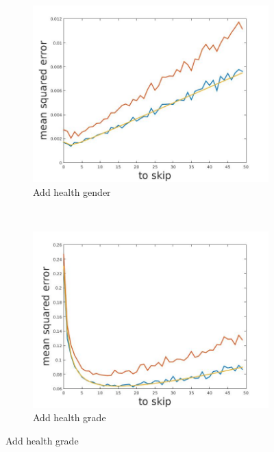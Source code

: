 \documentclass[12pt]{report}
\begin{document}
\begin{figure}[h]
    \begin{subfigure}[b]{0.3\textwidth}
        \includegraphics[width=\textwidth]{estimators_sex}
        \caption{ Add health gender}

    \end{subfigure}
    ~
    \begin{subfigure}[b]{0.3\textwidth}
        \includegraphics[width=\textwidth]{estimators_grade}
        \caption{ Add health grade }


\end{subfigure}
\end{figure}
\end{document}
